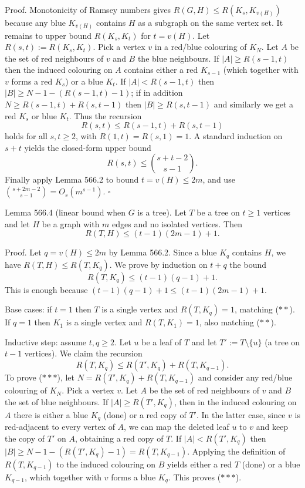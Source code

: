 Proof.
Monotonicity of Ramsey numbers gives $R(G,H)\le R(K_s,K_{v(H)})$ because any blue $K_{v(H)}$ contains $H$ as a subgraph on the same vertex set.
It remains to upper bound $R(K_s,K_t)$ for $t=v(H)$.
Let $R(s,t):=R(K_s,K_t)$.
Pick a vertex $v$ in a red/blue colouring of $K_N$.
Let $A$ be the set of red neighbours of $v$ and $B$ the blue neighbours.
If $|A|\ge R(s-1,t)$ then the induced colouring on $A$ contains either a red $K_{s-1}$ (which together with $v$ forms a red $K_s$) or a blue $K_t$.
If $|A|<R(s-1,t)$ then $|B|\ge N-1-(R(s-1,t)-1)$; if in addition $N\ge R(s-1,t)+R(s,t-1)$ then $|B|\ge R(s,t-1)$ and similarly we get a red $K_s$ or blue $K_t$.
Thus the recursion
\[
R(s,t) \le R(s-1,t)+R(s,t-1)
\]
holds for all $s,t\ge 2$, with $R(1,t)=R(s,1)=1$.
A standard induction on $s+t$ yields the closed-form upper bound
\[
R(s,t) \le \binom{s+t-2}{s-1}.
\]
Finally apply Lemma 566.2 to bound $t=v(H)\le 2m$, and use $\binom{s+2m-2}{s-1}=O_s(m^{s-1})$. \hfill$\square$

Lemma 566.4 (linear bound when $G$ is a tree).
Let $T$ be a tree on $t\ge 1$ vertices and let $H$ be a graph with $m$ edges and no isolated vertices.
Then
\[
R(T,H) \le (t-1)(2m-1)+1.
\]

Proof.
Let $q=v(H)\le 2m$ by Lemma 566.2.
Since a blue $K_q$ contains $H$, we have $R(T,H)\le R(T,K_q)$.
We prove by induction on $t+q$ the bound
\[
R(T,K_q) \le (t-1)(q-1)+1. \tag{$**$}
\]
This is enough because $(t-1)(q-1)+1\le (t-1)(2m-1)+1$.

Base cases: if $t=1$ then $T$ is a single vertex and $R(T,K_q)=1$, matching ($**$).
If $q=1$ then $K_1$ is a single vertex and $R(T,K_1)=1$, also matching ($**$).

Inductive step: assume $t,q\ge 2$.
Let $u$ be a leaf of $T$ and let $T':=T\setminus\{u\}$ (a tree on $t-1$ vertices).
We claim the recursion
\[
R(T,K_q) \le R(T',K_q)+R(T,K_{q-1}). \tag{$***$}
\]
To prove ($***$), let $N = R(T',K_q)+R(T,K_{q-1})$ and consider any red/blue colouring of $K_N$.
Pick a vertex $v$.
Let $A$ be the set of red neighbours of $v$ and $B$ the set of blue neighbours.
If $|A|\ge R(T',K_q)$, then in the induced colouring on $A$ there is either a blue $K_q$ (done) or a red copy of $T'$.
In the latter case, since $v$ is red-adjacent to every vertex of $A$, we can map the deleted leaf $u$ to $v$ and keep the copy of $T'$ on $A$, obtaining a red copy of $T$.
If $|A|<R(T',K_q)$ then $|B|\ge N-1-(R(T',K_q)-1)=R(T,K_{q-1})$.
Applying the definition of $R(T,K_{q-1})$ to the induced colouring on $B$ yields either a red $T$ (done) or a blue $K_{q-1}$, which together with $v$ forms a blue $K_q$.
This proves ($***$).

